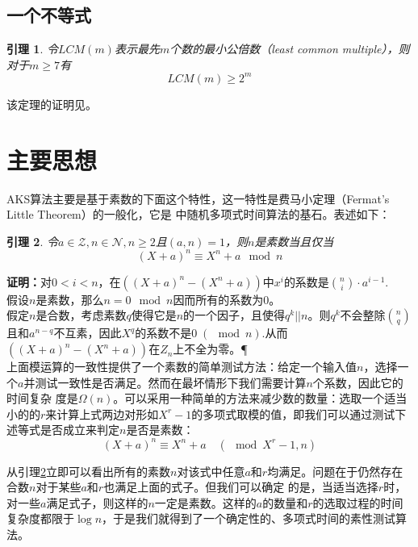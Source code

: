 \documentclass[a4paper]{article}
\newtheorem{lemma}{引理}[section]
\numberwithin{equation}{section}
\begin{document}
\begin{multicols}{2}
  \subsection{一个不等式}
  \begin{lemma}\label{lcm}
    \upshape 令$LCM(m)$表示最先$m$个数的最小公倍数（least common
    multiple），则对于$m\ge 7$有
\begin{equation}
 LCM(m)\ge 2^m
\end{equation}
  \end{lemma}
  该定理的证明见\cite{nai82}。

  \section{主要思想}
  AKS算法主要是基于素数的下面这个特性，这一特性是费马小定理（Fermat’s Little
  Theorem）的一般化，它是\cite{AB03} 中随机多项式时间算法的基石。表述如下：
  \begin{lemma}\label{idea}
    \upshape 令$a\in \mathcal{Z},n\in \mathcal{N},n\ge
    2$且$(a,n)=1$，则$n$是素数当且仅当
\begin{equation}
(X+a)^{n}\equiv X^n+a\mod{n}
\end{equation}
  \end{lemma}
  \noindent \textbf{证明：}对$0<i<n$，在$((X+a)^n - (X^n +
  a))$中$x^i$的系数是$\binom{n}{i}\cdot a^{i-1}$.\\[0.2cm]
  假设$n$是素数，那么$n=0\mod{n}$因而所有的系数为0。\\[0.2cm]
  假定$n$是合数，考虑素数$q$使得它是$n$的一个因子，且使得$q^k||n$。则$q^k$不会整除$\binom{n}{q}$且和$a^{
  n-q}$不互素，因此$X^q$的系数不是$0\;(\!\!\!\!\!\mod{n})$.从而$((X+a)^n-(X^n+a))$在$\mathit{Z}_n$上不全为零。\P\\[0.2cm]  
  上面模运算的一致性提供了一个素数的简单测试方法：给定一个输入值$n$，选择一个$a$并测试一致性是否满足。然而在最坏情形下我们需要计算$n$个系数，因此它的时间复杂
  度是$\Omega
  (n)$。可以采用一种简单的方法来减少数的数量：选取一个适当小的的$r$来计算上式两边对形如$X^r-1$的多项式取模的值，即我们可以通过测试下述等式是否成立来判定$n$是否是素数：
\begin{equation}\label{key}
 (X+a)^n\equiv X^n+a \quad(\!\!\!\!\!\mod{X^r-1},n)
\end{equation}

  从引理\ref{idea}立即可以看出所有的素数$n$对该式中任意$a$和$r$均满足。问题在于仍然存在合数$n$对于某些$a$和$r$也满足上面的式子。但我们可以确定
  的是，当适当选择$r$时，对一些$a$满足式子，则这样的$n$一定是素数。这样的$a$的数量和$r$的选取过程的时间复杂度都限于$\log
  n$，于是我们就得到了一个确定性的、多项式时间的素性测试算法。

\end{multicols}
\end{document}
